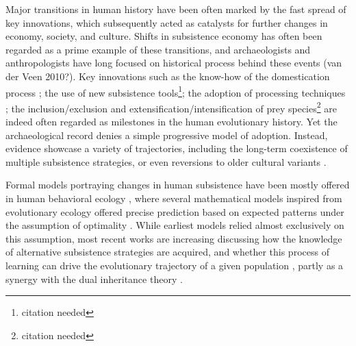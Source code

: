 \documentclass[preprint,authoryear]{elsarticle}
\begin{document}
Major transitions in human history have been often marked by the fast spread of key innovations, which subsequently acted as catalysts for further changes in economy, society, and culture. Shifts in subsistence economy has often been regarded as a prime example of these transitions, and archaeologists and anthropologists have long focused on historical process behind these events (van der Veen 2010?). Key innovations such as the know-how of the domestication process \citep{barker2006}; the use of new subsistence tools\footnote{citation needed}; the adoption of processing techniques \citep{molleson1993}; the inclusion/exclusion and extensification/intensification of prey species\footnote{citation needed} are indeed often regarded as milestones in the human evolutionary history. Yet the archaeological record denies a simple progressive model of adoption. Instead, evidence showcase a variety of trajectories, including the long-term coexistence of multiple subsistence strategies, or even reversions to older cultural variants \citep{rowley2001}.

Formal models portraying changes in human subsistence have been mostly offered in human behavioral ecology \citep{smith1992,bird2006,kennett2006}, where several mathematical models inspired from evolutionary ecology offered precise prediction based on expected patterns under the assumption of optimality \citep{belovsky1988}. While earliest models relied almost exclusively on this assumption, most recent works are increasing discussing how the knowledge of alternative subsistence strategies are acquired, and whether this process of learning can drive the evolutionary trajectory of a given population \citep{henrich1998}, partly as a synergy with the dual inheritance theory \citep{boyd1985}. 
\end{document}
